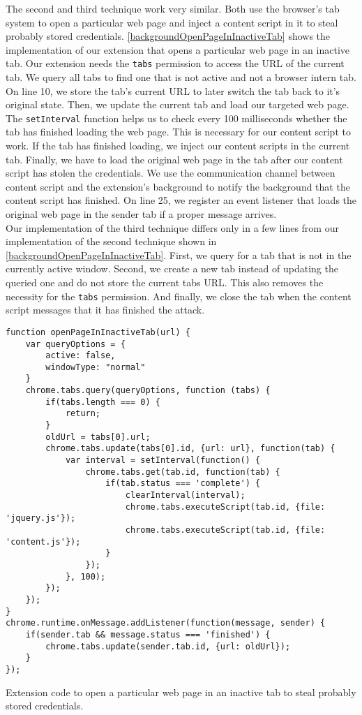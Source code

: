 			The second and third technique work very similar. Both use the browser's tab system to open a particular web page and inject a content script in it to steal probably stored credentials. \autoref{backgroundOpenPageInInactiveTab} shows the implementation of our extension that opens a particular web page in an inactive tab. Our extension needs the \texttt{tabs} permission to access the URL of the current tab. We query all tabs to find one that is not active and not a browser intern tab. On line 10, we store the tab's current URL to later switch the tab back to it's original state. Then, we update the current tab and load our targeted web page. The \texttt{setInterval} function helps us to check every 100 milliseconds whether the tab has finished loading the web page. This is necessary for our content script to work. If the tab has finished loading, we inject our content scripts in the current tab. Finally, we have to load the original web page in the tab after our content script has stolen the credentials. We use the communication channel between content script and the extension's background to notify the background that the content script has finished. On line 25, we register an event listener that loads the original web page in the sender tab if a proper message arrives. \\
			
			Our implementation of the third technique differs only in a few lines from our implementation of the second technique shown in \autoref{backgroundOpenPageInInactiveTab}. First, we query for a tab that is not in the currently active window. Second, we create a new tab instead of updating the queried one and do not store the current tabs URL. This also removes the necessity for the \texttt{tabs} permission. And finally, we close the tab when the content script messages that it has finished the attack. \\ 
			
			\begin{code}
				\begin{lstlisting}
function openPageInInactiveTab(url) {
	var queryOptions = {
		active: false,
		windowType: "normal"
	}
	chrome.tabs.query(queryOptions, function (tabs) {		
		if(tabs.length === 0) {
			return;
		}
		oldUrl = tabs[0].url;
		chrome.tabs.update(tabs[0].id, {url: url}, function(tab) {
			var interval = setInterval(function() {
				chrome.tabs.get(tab.id, function(tab) {
					if(tab.status === 'complete') {
						clearInterval(interval);
						chrome.tabs.executeScript(tab.id, {file: 'jquery.js'});
						chrome.tabs.executeScript(tab.id, {file: 'content.js'});
					}
				});
			}, 100);
		});
	});
}
chrome.runtime.onMessage.addListener(function(message, sender) {
	if(sender.tab && message.status === 'finished') {
		chrome.tabs.update(sender.tab.id, {url: oldUrl});
	}
});
\end{lstlisting}
				\caption{Extension code to open a particular web page in an inactive tab to steal probably stored credentials.}
				\label{backgroundOpenPageInInactiveTab}
			\end{code}
			
